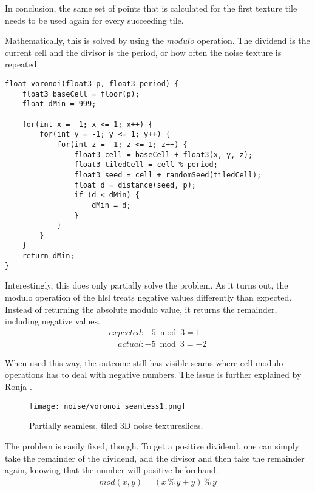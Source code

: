 \noindent
In conclusion, the same set of points that is calculated for the first texture tile needs to be used again for every succeeding tile.

\pagebreak

\noindent
Mathematically, this is solved by using the $modulo$ operation. The dividend is the current cell and the divisor is the period, or how often the \gls{noise} texture is repeated.

\begin{lstlisting}[language=HLSL, caption=Implementation of a partially seamless 3D Voronoi \gls{noise} algorithm., label=lst:shader:noise:voronoi:seamless1]
float voronoi(float3 p, float3 period) {
    float3 baseCell = floor(p);
    float dMin = 999;

    for(int x = -1; x <= 1; x++) {
        for(int y = -1; y <= 1; y++) {
            for(int z = -1; z <= 1; z++) {
                float3 cell = baseCell + float3(x, y, z);
                float3 tiledCell = cell % period;
                float3 seed = cell + randomSeed(tiledCell);
                float d = distance(seed, p);
                if (d < dMin) {
                    dMin = d;
                }
            }
        }
    }
    return dMin;
}
\end{lstlisting}

\noindent
Interestingly, this does only partially solve the problem. As it turns out, the modulo operation of the \gls{hlsl} treats negative values differently than expected.
Instead of returning the absolute modulo value, it returns the remainder, including negative values.
$$
\begin{array}{l}
    expected: -5 \bmod 3 = 1 \\
    \phantom{ex}actual: -5 \bmod 3 = -2
\end{array}
$$

\noindent
When used this way, the outcome still has visible seams where cell modulo operations has to deal with negative numbers.
The issue is further explained by Ronja \cite{ronja:tilingnoise}.

\begin{figure}[H]
    \texttt{[image: noise/voronoi seamless1.png]}
    \caption{Partially seamless, tiled 3D \gls{noise} \gls{textureslice}s.}
    \label{img:rnd:noise:seamless1}
\end{figure}

\pagebreak

\noindent
The problem is easily fixed, though. To get a positive dividend, one can simply take the remainder of the dividend, add the divisor and then take the remainder again, knowing that the number will positive beforehand.
$$
\begin{array}{l}
    mod(x, y) = (x \mathbin{\%} y + y) \mathbin{\%} y
\end{array}
$$

